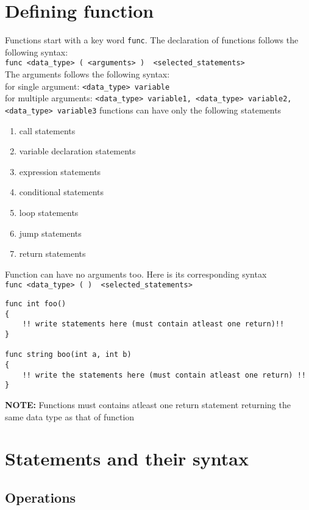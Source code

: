 \documentclass[journal, 18pt]{report}
\begin{document}
\chapter{Defining function}
Functions start with a key word \texttt{func}. The declaration of functions follows the following syntax:\\
\texttt{func <data\_type> (  <arguments> ) { <selected\_statements> }}\\
The arguments follows the following syntax:\\
for single argument: \texttt{<data\_type> variable} \\
for multiple arguments: \texttt{<data\_type> variable1, <data\_type> variable2, <data\_type> variable3}
functions can have only the following statements
\begin{enumerate}
    \item call statements
    \item variable declaration statements
    \item expression statements
    \item conditional statements
    \item loop statements
    \item jump statements
    \item return statements
\end{enumerate}
Function can have no arguments too. Here is its corresponding syntax\\
\texttt{func <data\_type> ( ) { <selected\_statements> }}
\begin{lstlisting}
func int foo()
{
    !! write statements here (must contain atleast one return)!!
}

func string boo(int a, int b)
{
    !! write the statements here (must contain atleast one return) !!
}
\end{lstlisting}

\textbf{NOTE:} Functions must contains atleast one return statement returning the same data type as that of function

\chapter{Statements and their syntax}
\section*{Operations}
\end{document}
